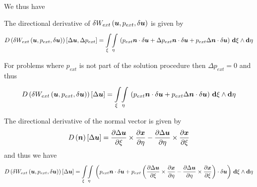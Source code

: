 We thus have

The directional derivative of $ \delta W_{ext}\left( \boldsymbol{u},p_{ext},\delta\boldsymbol{u} \right) $ is given by
\begin{equation}
     D\left(  \delta
      W_{ext}\left( \boldsymbol{u},p_{ext},\delta\boldsymbol{u} \right)  \right) \left[ \Delta\boldsymbol{u},\Delta p_{ext} \right]  =
    \displaystyle\int\limits_{\xi}^{} \! \displaystyle\int\limits_{\eta}^{} \,\left( p_{ext}\boldsymbol{n}\cdot\delta\boldsymbol{u}+\Delta
  p_{ext}\boldsymbol{n}\cdot\delta\boldsymbol{u}+p_{ext}\Delta\boldsymbol{n}\cdot\delta\boldsymbol{u} \right)\, \boldsymbol{\mathrm{d}} \xi\wedge \boldsymbol{\mathrm{d}} \eta 
\end{equation}

For problems where $p_{ext}$ is not part of the solution procedure then
$\Delta p_{ext}=0$ and thus
\begin{equation}
     D\left(  \delta
      W_{ext}\left( \boldsymbol{u},p_{ext},\delta\boldsymbol{u} \right)  \right) \left[ \Delta\boldsymbol{u} \right]  =
    \displaystyle\int\limits_{\xi}^{} \! \displaystyle\int\limits_{\eta}^{} \,\left( p_{ext}\boldsymbol{n}\cdot\delta\boldsymbol{u}+
      p_{ext}\Delta\boldsymbol{n}\cdot\delta\boldsymbol{u} \right)\, \boldsymbol{\mathrm{d}} \xi\wedge \boldsymbol{\mathrm{d}} \eta 
\end{equation}

The directional derivative of the normal vector is given by
\begin{equation}
     D\left( \boldsymbol{n} \right) \left[ \Delta\boldsymbol{u} \right]  = \dfrac{\partial \Delta\boldsymbol{u}}{\partial \xi} \times \dfrac{\partial \boldsymbol{x}}{\partial \eta} -
   \dfrac{\partial \Delta\boldsymbol{u}}{\partial \eta} \times \dfrac{\partial \boldsymbol{x}}{\partial \xi} 
\end{equation}
and thus we have
\begin{equation}
     D\left(  \delta
      W_{ext}\left( \boldsymbol{u},p_{ext},\delta\boldsymbol{u} \right)  \right) \left[ \Delta\boldsymbol{u} \right]  =
    \displaystyle\int\limits_{\xi}^{} \! \displaystyle\int\limits_{\eta}^{} \,\left( p_{ext}\boldsymbol{n}\cdot\delta\boldsymbol{u}+
      p_{ext}\left(  \dfrac{\partial \Delta\boldsymbol{u}}{\partial \xi} \times \dfrac{\partial \boldsymbol{x}}{\partial \eta} -
   \dfrac{\partial \Delta\boldsymbol{u}}{\partial \eta} \times \dfrac{\partial \boldsymbol{x}}{\partial \xi}  \right)\cdot\delta\boldsymbol{u} \right)\, \boldsymbol{\mathrm{d}} \xi\wedge \boldsymbol{\mathrm{d}} \eta 
\end{equation}

